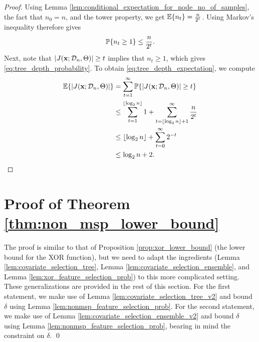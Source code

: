 \documentclass[11pt]{article}
\newcommand{\bx}{\mathbf{x}}
\DeclarePairedDelimiter{\braces}{\lbrace}{\rbrace}
\DeclarePairedDelimiter{\abs}{|}{|}
\renewcommand{\P}{\mathbb{P}}
\newcommand{\E}{\mathbb{E}}
\newcommand{\node}{\mathfrak{t}}
\newcommand{\nsamples}{n}
\newcommand{\data}[1][n]{\mathcal{D}_{#1}}
\begin{document}
\begin{proof}
    Using Lemma \ref{lem:conditional_expectation_for_node_no_of_samples}, the fact that $n_0 = n$, and the tower property, we get $\E\braces*{n_t} = \frac{n}{2^{t}}$.
    Using Markov's inequality therefore gives
    \begin{equation}
        \P\braces*{n_t \geq 1} \leq \frac{n}{2^{t}}.
    \end{equation}
    Next, note that $\abs*{J(\bx;\data,\Theta)} \geq t$ implies that $n_t \geq 1$, which gives \eqref{eq:tree_depth_probability}.
    To obtain \eqref{eq:tree_depth_expectation}, we compute
    \begin{equation}
        \begin{split}
            \E\braces*{\abs*{J(\bx;\data,\Theta)}} & = \sum_{t=1}^\infty\P\braces*{\abs*{J(\bx;\data,\Theta)} \geq t} \\
            & \leq \sum_{t=1}^{\lfloor \log_2 \nsamples \rfloor} 1 + \sum_{t=\lfloor \log_2 \nsamples \rfloor + 1}^\infty \frac{\nsamples}{2^{t}} \\
            & \leq \lfloor \log_2 \nsamples \rfloor + \sum_{t=0}^\infty 2^{-t} \\
            & \leq  \log_2 \nsamples  + 2. \qedhere
        \end{split}
    \end{equation}
\end{proof}

\section{Proof of Theorem \ref{thm:non_msp_lower_bound}}
\label{sec:non_msp_lower_bound_proof}

The proof is similar to that of Proposition \ref{prop:xor_lower_bound} (the lower bound for the XOR function), but we need to adapt the ingredients (Lemma \ref{lem:covariate_selection_tree}, Lemma \ref{lem:covariate_selection_ensemble}, and Lemma \ref{lem:xor_feature_selection_prob}) to this more complicated setting.
These generalizations are provided in the rest of this section.
For the first statement, we make use of Lemma \ref{lem:covariate_selection_tree_v2} and bound $\delta$ using Lemma \ref{lem:nonmsp_feature_selection_prob}.
For the second statement, we make use of Lemma \ref{lem:covariate_selection_ensemble_v2} and bound $\delta$ using Lemma \ref{lem:nonmsp_feature_selection_prob}, bearing in mind the constraint on $\delta$.
\qed
\end{document}
